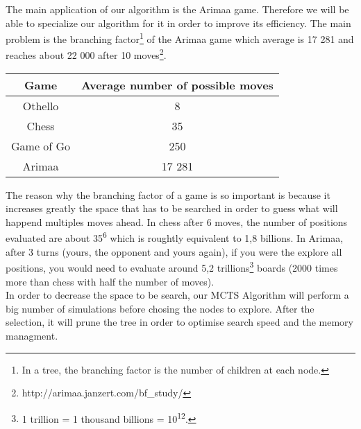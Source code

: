The main application of our algorithm is the Arimaa game. Therefore we will be able to specialize our algorithm for it in order to improve its efficiency. The main problem is the branching factor\footnote{In a tree, the branching factor is the number of children at each node.} of the Arimaa game which average is 17 281 and reaches about 22 000 after 10 moves\footnote{http://arimaa.janzert.com/bf\_study/}.\\
\bigskip
\begin{center}
	\begin{tabular}{ | c | c |}
		\hline Game & Average number of possible moves \\ \hline
		\hline  
		Othello & 8\\
		\hline  
		Chess & 35\\
		\hline  
		Game of Go & 250\\
		\hline
		Arimaa & 17 281\\
		\hline
	\end{tabular}
\end{center}
\bigskip
The reason why the branching factor of a game is so important is because it increases greatly the space that has to be searched in order to guess what will happend multiples moves ahead. In chess after 6 moves, the number of positions evaluated are about 35\textsuperscript{6} which is roughtly equivalent to 1,8 billions. In Arimaa, after 3 turns (yours, the opponent and yours again), if you were the explore all positions, you would need to evaluate around 5,2 trillions\footnote{1 trillion = 1 thousand billions = 10\textsuperscript{12}.} boards (2000 times more than chess with half the number of moves).
\bigskip\\
In order to decrease the space to be search, our MCTS Algorithm will perform a big number of simulations before chosing the nodes to explore. After the selection, it will prune the tree in order to optimise search speed and the memory managment.
